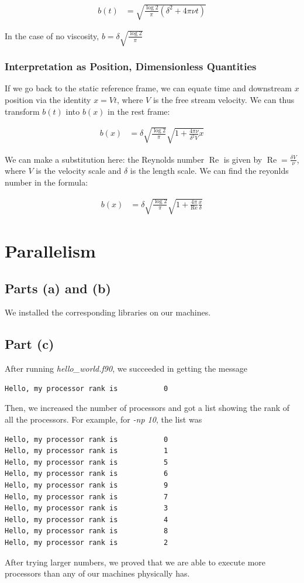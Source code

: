 \documentclass{article}
\DeclareMathOperator\Reynolds{Re}
\begin{document}
\begin{align}
b(t) & = \sqrt{ \frac{ \log 2}{\pi} \left( \delta^2 + 4 \pi \nu t \right) }
\end{align}

In the case of no viscosity, $b = \delta \sqrt{\frac{\log 2}{\pi}}$

\subsubsection{Interpretation as Position, Dimensionless Quantities}

If we go back to the static reference frame, we can equate time and downstream
	$x$ position via the identity $x = V t$, where $V$ is the free
	stream velocity.
We can thus transform $b(t)$ into $b(x)$ in the rest frame:

\begin{align}
b(x) & = \delta \sqrt{\frac{\log 2}{\pi}} \sqrt{1 + \frac{4 \pi \nu}{\delta^2 V} x}
\end{align}

We can make a substitution here: the Reynolds number $\Reynolds$ is given by
	$\Reynolds = \frac{\delta V}{\nu}$, where $V$ is the velocity scale
	and $\delta$ is the length scale.
We can find the reyonlds number in the formula:

\begin{align}
b(x) & = \delta \sqrt{\frac{\log 2}{\pi}} 
	\sqrt{1 + \frac{4 \pi}{\Reynolds} \frac{x}{\delta}}
\end{align}

\section{Parallelism}

\subsection{Parts (a) and (b)}
We installed the corresponding libraries on our machines.
 
\subsection{Part (c)} 
After running \textit{hello\_world.f90}, we succeeded in getting the message
\begin{verbatim}
Hello, my processor rank is           0
\end{verbatim}
Then, we increased the number of processors and got a list showing the rank of all the processors. For example,
for \textit{-np 10}, the list was
\begin{verbatim}
Hello, my processor rank is           0
Hello, my processor rank is           1
Hello, my processor rank is           5
Hello, my processor rank is           6
Hello, my processor rank is           9
Hello, my processor rank is           7
Hello, my processor rank is           3
Hello, my processor rank is           4
Hello, my processor rank is           8
Hello, my processor rank is           2
\end{verbatim}
After trying larger numbers, we proved that we are able to execute more processors than any of 
our machines physically has.
 
\end{document}
